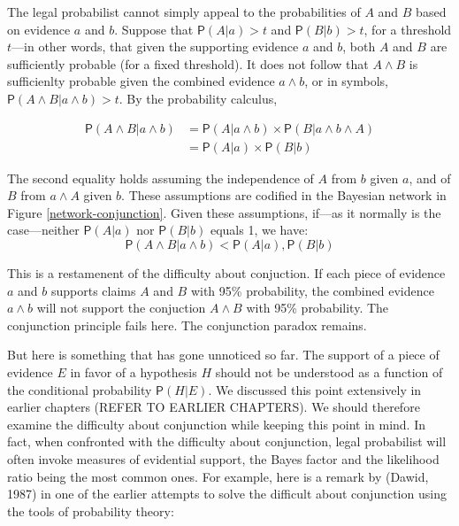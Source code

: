 \documentclass[10pt,dvipsnames,enabledeprecatedfontcommands]{scrartcl}
\newcommand{\et}{\wedge}
\newcommand{\pr}[1]{\mathsf{P}(#1)}
\begin{document}
The legal probabilist cannot simply appeal to the probabilities of \(A\)
and \(B\) based on evidence \(a\) and \(b\). Suppose that
\(\pr{A | a}>t\) and \(\pr{B | b}>t\), for a threshold \(t\)---in other
words, that given the supporting evidence \(a\) and \(b\), both \(A\)
and \(B\) are sufficiently probable (for a fixed threshold). It does not
follow that \(A \et B\) is sufficienlty probable given the combined
evidence \(a\et b\), or in symbols, \(\pr{A \wedge B | a \wedge b}>t\).
By the probability calculus,

\begin{align*}
\pr{A \wedge  B | a \wedge b}& =\pr{A |a \wedge b} \times \pr{B | a \wedge b \wedge A}\\
 & = \pr{A |a} \times \pr{B | b}
 \end{align*}

\noindent
The second equality holds assuming the independence of \(A\) from \(b\)
given \(a\), and of \(B\) from \(a \et A\) given \(b\).
These assumptions are codified in the Bayesian network in Figure
\ref{network-conjunction}.
 Given
these assumptions, if---as it normally is the case---neither
\(\pr{A \vert a}\) nor \(\pr{B \vert b}\) equals 1, we have:
\[\pr{A \wedge B \vert a \wedge b}< \pr{A \vert a}, \pr{B \vert b}  \]

\noindent
This is a restamenent of the difficulty about conjuction. If each piece
of evidence \(a\) and \(b\) supports claims \(A\) and \(B\) with 95\%
probability, the combined evidence \(a\et b\) will not support the
conjuction \(A\et B\) with 95\% probability. The conjunction principle
fails here. The conjunction paradox remains.

But here is something that has gone unnoticed so far. The support of a
piece of evidence \(E\) in favor of a hypothesis \(H\) should not be
understood as a function of the conditional probability \(\pr{H | E}\).
We discussed this point extensively in earlier chapters (REFER TO
EARLIER CHAPTERS). We should therefore examine the difficulty about
conjunction while keeping this point in mind. In fact, when confronted
with the difficulty about conjunction, legal probabilist will often
invoke measures of evidential support, the Bayes factor and the
likelihood ratio being the most common ones. For example, here is a
remark by (Dawid, 1987) in one of the earlier attempts to solve the
difficult about conjunction using the tools of probability theory:
\end{document}
